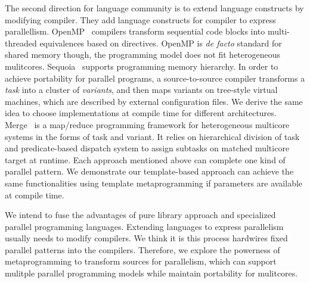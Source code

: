 

The second direction for language community is to extend language constructs by
modifying compiler. They add language constructs for compiler to
express parallellism. OpenMP~\cite{openmp} compilers transform sequential code blocks into
multi-threaded equivalences based on
directives. OpenMP is \textit{de facto} standard for shared memory
though, the programming model does not fit heterogeneous mulitcores. Sequoia~\cite{sequoia, sequoia-compiler} supports
programming memory hierarchy. In order to achieve portability for
parallel programs, a source-to-source compiler transforms a \textit{task} into a cluster of
\emph{variants}, and then maps variants on tree-style virtual 
machines, which are described by external configuration files.
We derive the same idea to choose implementations at compile time for
different architectures. Merge~\cite{merge} is a map/reduce programming
framework for heterogeneous multicore 
systems in the forms of task and variant. It relies on hierarchical division of task and predicate-based
dispatch system to assign subtasks on matched multicore target at
runtime. Each approach mentioned above can complete one kind of parallel pattern.
We demonstrate our template-based approach can achieve the same
functionalities using template metaprogramming if parameters are
available at compile time. 

We intend to fuse the advantages of pure library approach and
specialized parallel programming languages. Extending 
languages to express parallelism usually needs to modify compilers. We
think it is this process hardwires fixed parallel patterns into the
compilers. Therefore, we explore the powerness of metaprogramming to
transform sources for parallelism, which
can support mulitple parallel programming models while maintain
portability for mulitcores.

